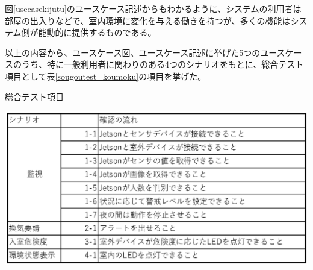 図\ref{usecasekijutu}のユースケース記述からもわかるように、システムの利用者は部屋の出入りなどで、室内環境に変化を与える働きを持つが、多くの機能はシステム側が能動的に提供するものである。

以上の内容から、ユースケース図、ユースケース記述に挙げた5つのユースケースのうち、特に一般利用者に関わりのある4つのシナリオをもとに、総合テスト項目として表\ref{sougoutest_koumoku}の項目を挙げた。

\begin{table}[H]
	\centering
	\caption{総合テスト項目}
	\includegraphics[width=15cm]{sougoutest_koumoku.eps}
	\label{sougoutest_koumoku}
\end{table}

